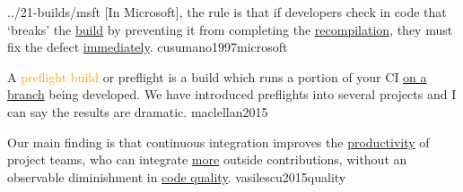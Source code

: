 \documentclass{article}
\begin{document}
\lnQuote
  {../21-builds/msft}
  {[In Microsoft], the rule is that if developers check in code that `breaks' the \ul{build} by preventing it from completing the \ul{recompilation}, they must fix the defect \ul{immediately}.}
  {cusumano1997microsoft}

  {A \textcolor{orange}{preflight build} or preflight is a build which runs a portion of your CI \ul{on a branch} being developed. We have introduced preflights into several projects and I can say the results are dramatic.}
  {maclellan2015}



  {Our main finding is that continuous integration improves the \ul{productivity} of project teams, who can integrate \ul{more} outside contributions, without an observable diminishment in \ul{code quality}.}
  {vasilescu2015quality}
\end{document}
